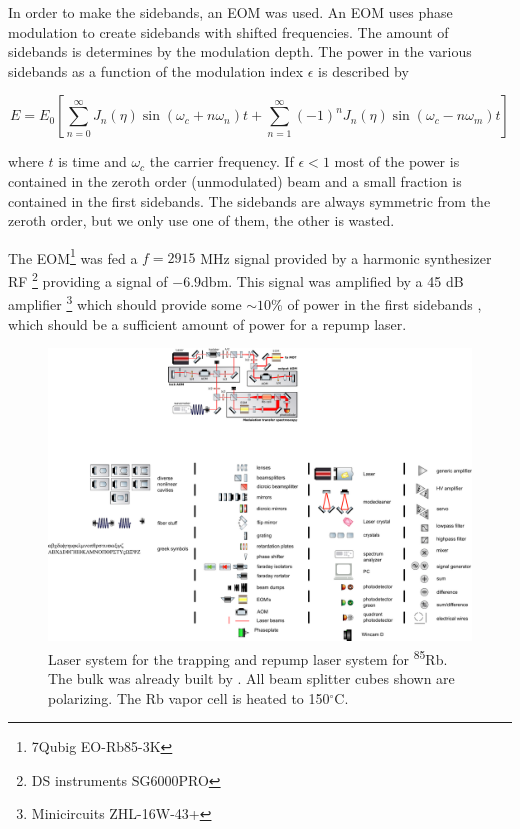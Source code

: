 In order to make the sidebands, an EOM was used. An EOM uses phase modulation to create sidebands with shifted frequencies. The amount of sidebands is determines by the modulation depth. The power in the various sidebands as a function of the modulation index $\epsilon$ is described by \cite{McCarron2008}

\begin{equation}
    E = E_0 \left[
        \sum_{n=0}^{\infty} J_n(\eta)\sin{(\omega_c+n\omega_n)t}+
        \sum_{n=1}^{\infty} (-1)^n J_n(\eta) \sin{(\omega_c-n\omega_m)t}
    \right]
\end{equation}

where $t$ is time and $\omega_c$ the carrier frequency. If $\epsilon <1$ most of the power is contained in the zeroth order (unmodulated) beam and a small fraction is contained in the first sidebands. The sidebands are always symmetric from the zeroth order, but we only use one of them, the other is wasted. 

The EOM\footnote{7Qubig EO-Rb85-3K} was fed a $f = 2915$ MHz signal provided by a harmonic synthesizer RF \footnote{DS instruments SG6000PRO} providing a signal of $-6.9$dbm. This signal was amplified by a 45 dB amplifier \footnote{Minicircuits ZHL-16W-43+} which should provide some $\sim 10$\% of power in the first sidebands \cite{Rens2014}, which should be a sufficient amount of power for a repump laser. 

\begin{figure}
    \centering
    \includegraphics[width=\linewidth]{figures/RbLaserSetup.pdf}
    \caption{Laser system for the trapping and repump laser system for \textsuperscript{85}Rb. The bulk was already built by \cite{Reijnders2010}. All beam splitter cubes shown are polarizing. The Rb vapor cell is heated to 150${^{\circ}}$C.}
    \label{fig:RbLaserSetup}
\end{figure}

